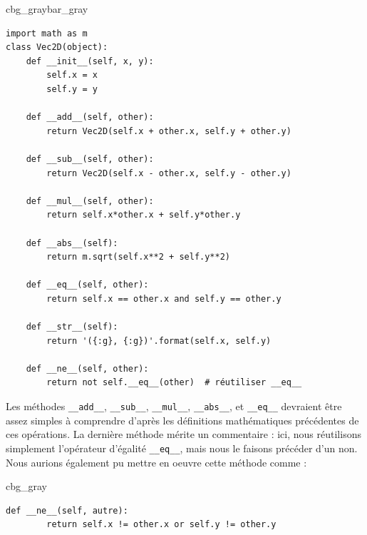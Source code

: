 \documentclass[%
oneside,                 %
final,                   %
10pt]{article}
\newenvironment{_cod_tight}[1]{
   \def\FrameCommand{\colorbox{#1}}
   \FrameRule0.6pt\MakeFramed {\FrameRestore}\vskip3mm}
   {\vskip0mm\endMakeFramed}
\newenvironment{cod}[1]{
\bgroup\rmfamily
\fboxsep=0mm\relax
\begin{_cod_tight}{#1}
\list{}{\parsep=-2mm\parskip=0mm\topsep=0pt\leftmargin=2mm
\rightmargin=2\leftmargin\leftmargin=4pt\relax}
\item\relax}
{\endlist\end{_cod_tight}\egroup}
\newenvironment{_pro_tight}[2]{
   \def\FrameCommand{\color{#2}\vrule width 1mm\normalcolor\colorbox{#1}}
   \FrameRule0.6pt\MakeFramed {\advance\hsize-2mm\FrameRestore}\vskip3mm}
   {\vskip0mm\endMakeFramed}
\newenvironment{pro}[2]{
\bgroup\rmfamily
\fboxsep=0mm\relax
\begin{_pro_tight}{#1}{#2}
\list{}{\parsep=-2mm\parskip=0mm\topsep=0pt\leftmargin=2mm
\rightmargin=2\leftmargin\leftmargin=4pt\relax}
\item\relax}
{\endlist\end{_pro_tight}\egroup}
\begin{document}
\begin{pro}{cbg_gray}{bar_gray}\begin{verbatim}
import math as m
class Vec2D(object):
    def __init__(self, x, y):
        self.x = x
        self.y = y

    def __add__(self, other):
        return Vec2D(self.x + other.x, self.y + other.y)

    def __sub__(self, other):
        return Vec2D(self.x - other.x, self.y - other.y)

    def __mul__(self, other):
        return self.x*other.x + self.y*other.y

    def __abs__(self):
        return m.sqrt(self.x**2 + self.y**2)

    def __eq__(self, other):
        return self.x == other.x and self.y == other.y

    def __str__(self):
        return '({:g}, {:g})'.format(self.x, self.y)

    def __ne__(self, other):
        return not self.__eq__(other)  # réutiliser __eq__
\end{verbatim}
\end{pro}
\noindent
Les méthodes \Verb!__add__!, \Verb!__sub__!, \Verb!__mul__!, \Verb!__abs__!, et \Verb!__eq__! devraient être assez simples à comprendre d'après les définitions mathématiques précédentes de ces opérations. La dernière méthode mérite un commentaire : ici, nous réutilisons simplement l'opérateur d'égalité \Verb!__eq__!, mais nous le faisons précéder d'un non. Nous aurions également pu mettre en oeuvre cette méthode comme :
\begin{cod}{cbg_gray}\begin{verbatim}
def __ne__(self, autre):
        return self.x != other.x or self.y != other.y
\end{verbatim}
\end{cod}
\noindent
\end{document}

